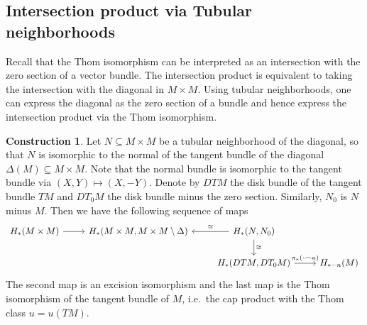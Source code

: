 \documentclass{scrartcl}
\theoremstyle{plain}
\theoremstyle{definition}
\newtheorem{construction}[theorem]{Construction}
\renewcommand{\subset}{\subseteq}
\newcommand{\capp}{\mathbin{\frown}}
\newcommand{\cupp}{\mathbin{\smile}}
\newcommand{\iso}{\cong}
\begin{document}







\subsection{Intersection product via Tubular neighborhoods} \label{subsec:intersection-via-tubular}
Recall that the Thom isomorphism can be interpreted as an intersection with the zero section of a vector bundle. The intersection product is equivalent to taking the intersection with the diagonal in $M\times M$. Using tubular neighborhoods, one can express the diagonal as the zero section of a bundle and hence express the intersection product via the Thom isomorphism.

\begin{construction}\label{constr:isect-via-tubular}
Let $N\subset M\times M$ be a tubular neighborhood of the diagonal, so that $N$ is isomorphic to the normal of the tangent bundle of the diagonal $\Delta(M)\subset M\times M$. Note that the normal bundle is isomorphic to the tangent bundle via $(X, Y)\mapsto (X, -Y)$. Denote by $DTM$ the disk bundle of the tangent bundle $TM$ and $DT_0M$ the disk bundle minus the zero section. Similarly, $N_0$ is $N$ minus $M$. Then we have the following sequence of maps
\begin{equation}
\begin{tikzcd}
    H_*(M\times M) \rar & H_*(M\times M, M\times M\setminus \Delta) & \lar[swap, "\iso"] H_*(N, N_0) \dar["\iso"] &\ \\
    & & H_*(DTM, DT_0M) \rar["\pi_*(\cdot \capp u)"] & H_{*-n}(M)
\end{tikzcd}
\end{equation}
The second map is an excision isomorphism and the last map is the Thom isomorphism of the tangent bundle of $M$, i.e.\ the cap product with the Thom class $u=u(TM)$. 
\end{construction}
\end{document}
